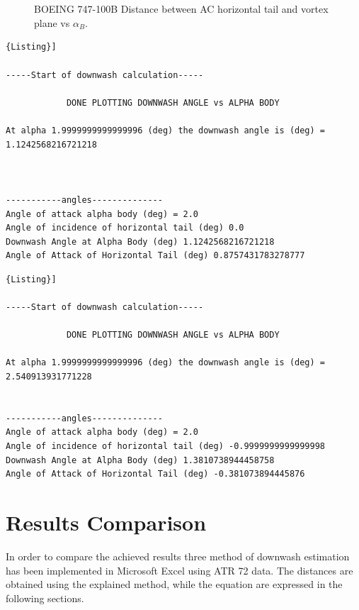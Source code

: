 \noindent \\ \\ 

\begin{figure}[H]
\centering

\caption{BOEING 747-100B  Distance between AC horizontal tail and vortex plane vs $\alpha_{B}$.}
\label{fig:zboeing}
\end{figure}

\newpage
\begin{lstlisting}[caption={{\footnotesize Downwash estimation - Results. ATR 72}},label= [style=\bfseries]{Listing}]

-----Start of downwash calculation-----

			DONE PLOTTING DOWNWASH ANGLE vs ALPHA BODY

At alpha 1.9999999999999996 (deg) the downwash angle is (deg) = 1.1242568216721218

 
 
-----------angles-------------- 
Angle of attack alpha body (deg) = 2.0
Angle of incidence of horizontal tail (deg) 0.0
Downwash Angle at Alpha Body (deg) 1.1242568216721218
Angle of Attack of Horizontal Tail (deg) 0.8757431783278777
\end{lstlisting}


\begin{lstlisting}[caption={{\footnotesize Downwash estimation - Results. BOEING 747-100B}},label= [style=\bfseries]{Listing}]

-----Start of downwash calculation-----

			DONE PLOTTING DOWNWASH ANGLE vs ALPHA BODY

At alpha 1.9999999999999996 (deg) the downwash angle is (deg) = 2.540913931771228

 
-----------angles-------------- 
Angle of attack alpha body (deg) = 2.0
Angle of incidence of horizontal tail (deg) -0.9999999999999998
Downwash Angle at Alpha Body (deg) 1.3810738944458758
Angle of Attack of Horizontal Tail (deg) -0.381073894445876
\end{lstlisting}

\section{Results Comparison}

In order to compare the achieved results three method of downwash estimation has been implemented in Microsoft Excel using ATR 72 data. The distances are obtained using the explained method, while the equation are expressed in the following sections.



